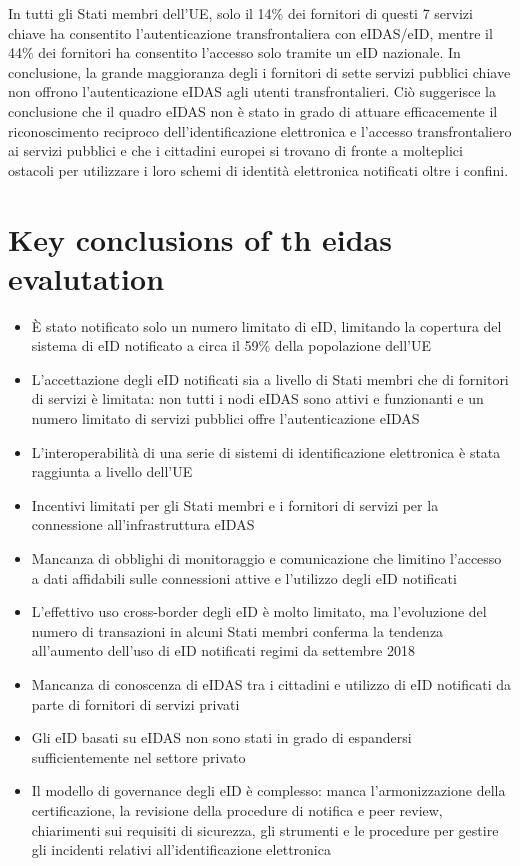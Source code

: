 In tutti gli Stati membri dell'UE, solo il 14\% dei fornitori di questi 7 servizi chiave ha consentito l'autenticazione transfrontaliera con eIDAS/eID, mentre il 44\% dei fornitori ha consentito l'accesso solo tramite un eID nazionale. In conclusione, la grande maggioranza degli i fornitori di sette servizi pubblici chiave non offrono l'autenticazione eIDAS agli utenti transfrontalieri. Ciò suggerisce la conclusione che il quadro eIDAS non è stato in grado di attuare efficacemente il riconoscimento reciproco dell'identificazione elettronica e l'accesso transfrontaliero ai servizi pubblici e che i cittadini europei si trovano di fronte a molteplici ostacoli per utilizzare i loro schemi di identità elettronica notificati oltre i confini.

\section{Key conclusions of th eidas evalutation}
\begin{itemize}
    \item È stato notificato solo un numero limitato di eID, limitando la copertura del sistema di eID notificato
    a circa il 59\% della popolazione dell'UE
    \item L'accettazione degli eID notificati sia a livello di Stati membri che di fornitori di servizi è limitata: non tutti i nodi eIDAS sono attivi e funzionanti e un numero limitato di servizi pubblici offre l'autenticazione eIDAS
    \item L'interoperabilità di una serie di sistemi di identificazione elettronica è stata raggiunta a livello dell'UE
    \item Incentivi limitati per gli Stati membri e i fornitori di servizi per la connessione all'infrastruttura eIDAS
    \item Mancanza di obblighi di monitoraggio e comunicazione che limitino l'accesso a dati affidabili sulle connessioni attive e l'utilizzo degli eID notificati
    \item L'effettivo uso cross-border degli eID è molto limitato, ma l'evoluzione del numero di
    transazioni in alcuni Stati membri conferma la tendenza all'aumento dell'uso di eID notificati
    regimi da settembre 2018
    \item Mancanza di conoscenza di eIDAS tra i cittadini e utilizzo di eID notificati da parte di fornitori di servizi privati
    \item Gli eID basati su eIDAS non sono stati in grado di espandersi sufficientemente nel settore privato
    \item Il modello di governance degli eID è complesso: manca l'armonizzazione della certificazione, la revisione della
    procedure di notifica e peer review, chiarimenti sui requisiti di sicurezza, gli strumenti e le procedure per gestire gli incidenti relativi all'identificazione elettronica
    
\end{itemize}